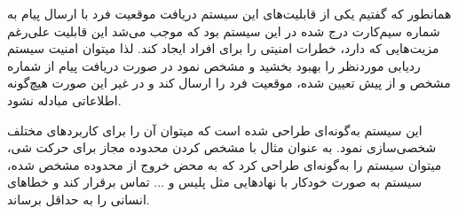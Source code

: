 همانطور که گفتیم یکی از قابلیت‌های این سیستم دریافت موقعیت فرد با ارسال پیام به شماره سیم‌کارت درج شده در این سیستم بود که موجب می‌شد این قابلیت علی‌رغم مزیت‌هایی که دارد، خطرات امنیتی را برای افراد ایجاد کند. لذا میتوان امنیت سیستم ردیابی موردنظر را بهبود بخشید و مشخص نمود در صورت دریافت پیام از شماره مشخص و از پیش تعیین شده، موقعیت فرد را ارسال کند و در غیر این صورت هیچ‌گونه اطلاعاتی مبادله نشود.


این سیستم به‌گونه‌ای طراحی شده است که میتوان آن را برای کاربردهای مختلف شخصی‌سازی نمود. به عنوان مثال با مشخص کردن محدوده مجاز برای حرکت شی، میتوان سیستم را به‌گونه‌ای طراحی کرد که به محض خروج از محدوده مشخص شده، سیستم به صورت خودکار با نهادهایی مثل پلیس و ... تماس برقرار کند و خطاهای انسانی را به حداقل برساند.
